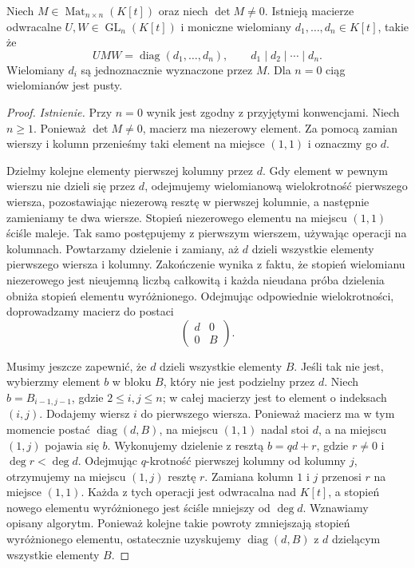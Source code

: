 \begin{twierdzenie}
\label{thm:lin19-smith}
Niech \(M\in\operatorname{Mat}_{n\times n}(K[t])\)
oraz niech \(\det M\ne0\).
Istnieją macierze odwracalne
\(U,W\in\operatorname{GL}_n(K[t])\)
i moniczne wielomiany
\(d_1,\ldots,d_n\in K[t]\), takie że
\[
 UMW=\operatorname{diag}(d_1,\ldots,d_n),
 \qquad d_1\mid d_2\mid\cdots\mid d_n.
\]
Wielomiany \(d_i\) są jednoznacznie
wyznaczone przez \(M\).
Dla \(n=0\) ciąg wielomianów jest pusty.
\end{twierdzenie}
\begin{proof}
\emph{Istnienie.}
Przy \(n=0\) wynik jest zgodny
z przyjętymi konwencjami.
Niech \(n\ge1\).
Ponieważ \(\det M\ne0\),
macierz ma niezerowy element.
Za pomocą zamian wierszy i kolumn
przenieśmy taki element
na miejsce \((1,1)\) i oznaczmy go \(d\).

Dzielmy kolejne elementy
pierwszej kolumny przez \(d\).
Gdy element w pewnym wierszu
nie dzieli się przez \(d\),
odejmujemy wielomianową wielokrotność
pierwszego wiersza, pozostawiając
niezerową resztę w pierwszej kolumnie,
a następnie zamieniamy te dwa wiersze.
Stopień niezerowego elementu na miejscu
\((1,1)\) ściśle maleje.
Tak samo postępujemy z pierwszym
wierszem, używając operacji na kolumnach.
Powtarzamy dzielenie i zamiany,
aż \(d\) dzieli wszystkie elementy
pierwszego wiersza i kolumny.
Zakończenie wynika z faktu, że
stopień wielomianu niezerowego
jest nieujemną liczbą całkowitą
i każda nieudana próba dzielenia
obniża stopień elementu wyróżnionego.
Odejmując odpowiednie wielokrotności,
doprowadzamy macierz do postaci
\[
 \begin{pmatrix}d&0\\0&B\end{pmatrix}.
\]

Musimy jeszcze zapewnić, że \(d\)
dzieli wszystkie elementy \(B\).
Jeśli tak nie jest, wybierzmy element
\(b\) w bloku \(B\), który nie jest
podzielny przez \(d\).
Niech \(b=B_{i-1,j-1}\), gdzie
\(2\le i,j\le n\); w całej macierzy
jest to element o indeksach \((i,j)\).
Dodajemy wiersz \(i\) do pierwszego wiersza. Ponieważ macierz
ma w tym momencie postać
\(\operatorname{diag}(d,B)\),
na miejscu \((1,1)\) nadal stoi \(d\),
a na miejscu \((1,j)\) pojawia się \(b\).
Wykonujemy dzielenie z resztą
\(b=qd+r\), gdzie \(r\ne0\)
i \(\deg r<\deg d\).
Odejmując \(q\)-krotność pierwszej
kolumny od kolumny \(j\),
otrzymujemy na miejscu \((1,j)\)
resztę \(r\). Zamiana kolumn
\(1\) i \(j\) przenosi \(r\)
na miejsce \((1,1)\).
Każda z tych operacji jest odwracalna
nad \(K[t]\), a stopień nowego
elementu wyróżnionego jest
ściśle mniejszy od \(\deg d\).
Wznawiamy opisany algorytm.
Ponieważ kolejne takie powroty
zmniejszają stopień wyróżnionego elementu,
ostatecznie uzyskujemy
\(\operatorname{diag}(d,B)\)
z \(d\) dzielącym wszystkie elementy \(B\).


\end{proof}
